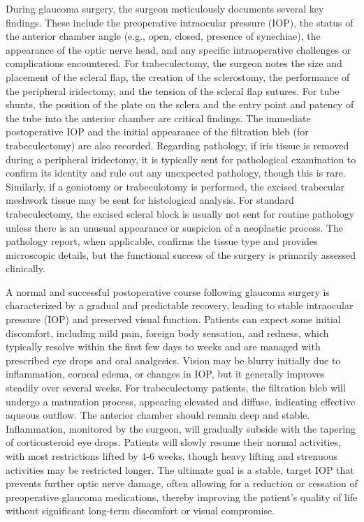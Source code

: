 During glaucoma surgery, the surgeon meticulously documents several key findings. These include the preoperative intraocular pressure (IOP), the status of the anterior chamber angle (e.g., open, closed, presence of synechiae), the appearance of the optic nerve head, and any specific intraoperative challenges or complications encountered. For trabeculectomy, the surgeon notes the size and placement of the scleral flap, the creation of the sclerostomy, the performance of the peripheral iridectomy, and the tension of the scleral flap sutures. For tube shunts, the position of the plate on the sclera and the entry point and patency of the tube into the anterior chamber are critical findings. The immediate postoperative IOP and the initial appearance of the filtration bleb (for trabeculectomy) are also recorded. Regarding pathology, if iris tissue is removed during a peripheral iridectomy, it is typically sent for pathological examination to confirm its identity and rule out any unexpected pathology, though this is rare. Similarly, if a goniotomy or trabeculotomy is performed, the excised trabecular meshwork tissue may be sent for histological analysis. For standard trabeculectomy, the excised scleral block is usually not sent for routine pathology unless there is an unusual appearance or suspicion of a neoplastic process. The pathology report, when applicable, confirms the tissue type and provides microscopic details, but the functional success of the surgery is primarily assessed clinically.

A normal and successful postoperative course following glaucoma surgery is characterized by a gradual and predictable recovery, leading to stable intraocular pressure (IOP) and preserved visual function. Patients can expect some initial discomfort, including mild pain, foreign body sensation, and redness, which typically resolve within the first few days to weeks and are managed with prescribed eye drops and oral analgesics. Vision may be blurry initially due to inflammation, corneal edema, or changes in IOP, but it generally improves steadily over several weeks. For trabeculectomy patients, the filtration bleb will undergo a maturation process, appearing elevated and diffuse, indicating effective aqueous outflow. The anterior chamber should remain deep and stable. Inflammation, monitored by the surgeon, will gradually subside with the tapering of corticosteroid eye drops. Patients will slowly resume their normal activities, with most restrictions lifted by 4-6 weeks, though heavy lifting and strenuous activities may be restricted longer. The ultimate goal is a stable, target IOP that prevents further optic nerve damage, often allowing for a reduction or cessation of preoperative glaucoma medications, thereby improving the patient's quality of life without significant long-term discomfort or visual compromise.

